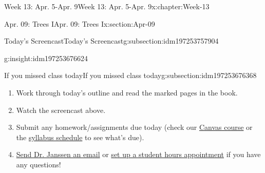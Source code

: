 \documentclass[oneside,10pt,]{book}
\numberwithin{equation}{section}
\begin{document}
\begin{chapterptx}{Week 13: Apr. 5-Apr. 9}{}{Week 13: Apr. 5-Apr. 9}{}{}{x:chapter:Week-13}
\begin{sectionptx}{Apr. 09: Trees I}{}{Apr. 09: Trees I}{}{}{x:section:Apr-09}
\begin{subsectionptx}{Today's Screencast}{}{Today's Screencast}{}{}{g:subsection:idm197253757904}
\begin{insight}{}{g:insight:idm197253676624}
\begin{tcbraster}[raster columns=2, raster column skip=1pt, raster halign=center, raster force size=false, raster left skip=0pt, raster right skip=0pt]
\begin{tcolorbox}[qrstyle]%
[QR LINK]\end{tcolorbox}%
\end{tcbraster}%
\end{insight}
\end{subsectionptx}
%
%
\typeout{************************************************}
\typeout{************************************************}
%
\begin{subsectionptx}{If you missed class today}{}{If you missed class today}{}{}{g:subsection:idm197253676368}
%
\begin{enumerate}
\item{}Work through today's outline and read the marked pages in the book.%
\item{}Watch the screencast above.%
\item{}Submit any homework\slash{}assignments due today (check our \href{https://dordt.instructure.com/courses/3110050}{Canvas course} or the \href{https://prof.mkjanssen.org/ds/index.html\#schedule}{syllabus schedule} to see what's due).%
\item{}\href{mailto:mike.janssen@dordt.edu}{Send Dr. Janssen an email} or \href{https://calendly.com/mkjanssen/student-hours}{set up a student hours appointment} if you have any questions!%
\end{enumerate}
\end{subsectionptx}
\end{sectionptx}
\end{chapterptx}
%
%
\typeout{************************************************}
\typeout{************************************************}
%
\end{document}
